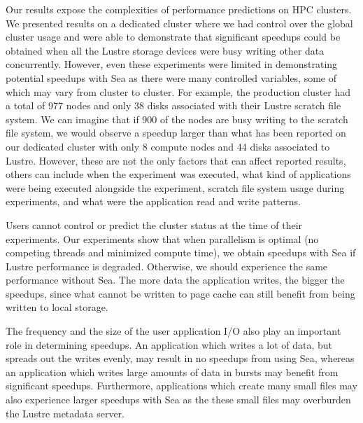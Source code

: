 \documentclass[fleqn,10pt]{wlscirep}
\begin{document}
    Our results expose the complexities of performance predictions on HPC clusters. We presented results on a dedicated cluster
    where we had
    control over the global cluster usage and were able to demonstrate that
    significant speedups could be obtained when all the Lustre storage devices were
    busy writing other data concurrently. However, even these experiments were
    limited in demonstrating potential speedups with Sea as there were many
    controlled variables, some of which may vary from cluster to cluster. For
    example, the production cluster had a total of 977 nodes and only 38 disks associated with
    their Lustre scratch file system. We can imagine that if 900 of the nodes
    are busy writing to the scratch file system, we would observe a speedup
    larger than what has been reported on our dedicated cluster with only 8 compute
    nodes and 44 disks associated to Lustre. However, these are not the only
    factors that can affect reported results, others can include when the
    experiment was executed, what kind of applications were being executed
    alongside the experiment, scratch file system usage during experiments, and
    what were the application read and write patterns.

    Users cannot control or predict the cluster status at the time of their
    experiments.
    Our experiments show that when parallelism is optimal (no competing threads
    and minimized compute time), we obtain speedups with Sea if Lustre
    performance is degraded. Otherwise, we should experience the same
    performance without Sea. The more data the application writes, the bigger
    the speedups, since what cannot be written to page cache can still benefit from
    being written to local storage.
    
    The frequency and the size of the user application I/O also play an
    important role in determining speedups. An application which writes a lot of
    data, but spreads out the writes evenly, may result in no speedups from
    using Sea, whereas an application which writes large amounts of data in
    bursts may benefit from significant speedups. Furthermore, applications
    which create many small files may also experience larger speedups with Sea
    as the these small files may overburden the Lustre metadata server.

    
\end{document}
